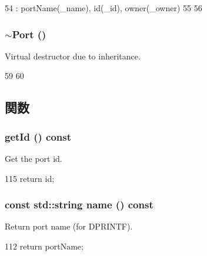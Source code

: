 \begin{DoxyCode}
54     : portName(_name), id(_id), owner(_owner)
55 {
56 }
\end{DoxyCode}
\hypertarget{classPort_ace19edfecfdf1557637d8d5bb9f91501}{
\subsubsection[{$\sim$Port}]{\setlength{\rightskip}{0pt plus 5cm}$\sim${\bf Port} ()}}
\label{classPort_ace19edfecfdf1557637d8d5bb9f91501}
Virtual destructor due to inheritance. 


\begin{DoxyCode}
59 {
60 }
\end{DoxyCode}


\subsection{関数}
\hypertarget{classPort_ad95169ead4fa2bd3241b2bbb1bc7b420}{
\subsubsection[{getId}]{ getId () const}}
\label{classPort_ad95169ead4fa2bd3241b2bbb1bc7b420}
Get the port id. 


\begin{DoxyCode}
115 { return id; }
\end{DoxyCode}
\hypertarget{classPort_a6490f765a824ced1cc94979609fe7e07}{
\subsubsection[{name}]{\setlength{\rightskip}{0pt plus 5cm}const std::string name () const}}
\label{classPort_a6490f765a824ced1cc94979609fe7e07}
Return port name (for DPRINTF). 


\begin{DoxyCode}
112 { return portName; }
\end{DoxyCode}


